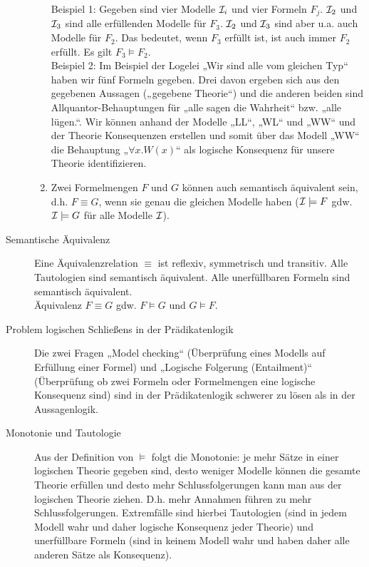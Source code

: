 \begin{description}
\begin{enumerate}
                Beispiel 1: Gegeben sind vier Modelle $\mathcal{I}_{i}$ und vier Formeln $F_{j}$. $\mathcal{I}_{2}$ und $\mathcal{I}_{3}$ sind alle erfüllenden Modelle für $F_{3}$. $\mathcal{I}_{2}$ und $\mathcal{I}_{3}$ sind aber u.a. auch Modelle für $F_{2}$. Das bedeutet, wenn $F_{3}$ erfüllt ist, ist auch immer $F_{2}$ erfüllt. Es gilt $F_{3} \models F_{2}$. \\

                Beispiel 2: Im Beispiel der Logelei „Wir sind alle vom gleichen Typ“ haben wir fünf Formeln gegeben. Drei davon ergeben sich aus den gegebenen Aussagen („gegebene Theorie“) und die anderen beiden sind Allquantor-Behauptungen für „alle sagen die Wahrheit“ bzw. „alle lügen.“. Wir können anhand der Modelle „LL“, „WL“ und „WW“ und der Theorie Konsequenzen erstellen und somit über das Modell „WW“ die Behauptung „$\forall x.W(x)$“ als logische Konsequenz für unsere Theorie identifizieren.

                \item Zwei Formelmengen $F$ und $G$ können auch semantisch äquivalent sein, d.h. $F \equiv G$, wenn sie genau die gleichen Modelle haben ($\mathcal{I} \models F$ gdw. $\mathcal{I} \models G$ für alle Modelle $\mathcal{I}$).
            \end{enumerate}
        \item[Semantische Äquivalenz] Eine Äquivalenzrelation $\equiv$ ist reflexiv, symmetrisch und transitiv. Alle Tautologien sind semantisch äquivalent. Alle unerfüllbaren Formeln sind semantisch äquivalent. \\ Äquivalenz $F \equiv G$ gdw. $F\models G$ und $G \models F$.
        \item[Problem logischen Schließens in der Prädikatenlogik] Die zwei Fragen „Model checking“ (Überprüfung eines Modells auf Erfüllung einer Formel) und „Logische Folgerung (Entailment)“ (Überprüfung ob zwei Formeln oder Formelmengen eine logische Konsequenz sind) sind in der Prädikatenlogik schwerer zu lösen als in der Aussagenlogik.
        \item[Monotonie und Tautologie] Aus der Definition von $\models$ folgt die Monotonie: je mehr Sätze in einer logischen Theorie gegeben sind, desto weniger Modelle können die gesamte Theorie erfüllen und desto mehr Schlussfolgerungen kann man aus der logischen Theorie ziehen. D.h. mehr Annahmen führen zu mehr Schlussfolgerungen. Extremfälle sind hierbei Tautologien (sind in jedem Modell wahr und daher logische Konsequenz jeder Theorie) und unerfüllbare Formeln (sind in keinem Modell wahr und haben daher alle anderen Sätze als Konsequenz).


\end{description}

